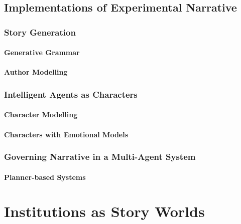 \documentclass[11pt]{report}
\begin{document}
\section{Implementations of Experimental Narrative}
\label{sec:narratology}

\subsection{Story Generation}

\subsubsection{Generative Grammar}

\subsubsection{Author Modelling}


\subsection{Intelligent Agents as Characters}

\subsubsection{Character Modelling}

\subsubsection{Characters with Emotional Models}



\subsection{Governing Narrative in a Multi-Agent System}
\subsubsection{Planner-based Systems}

\chapter{Institutions as Story Worlds}
\label{sec:institutions}
\end{document}
